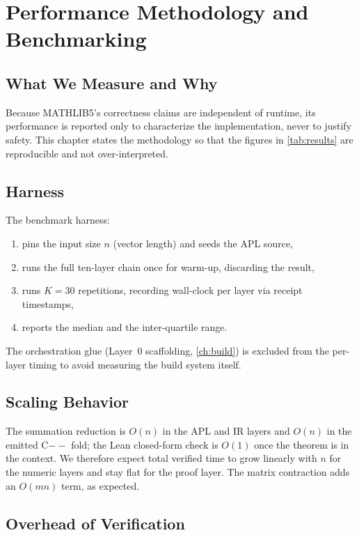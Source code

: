 \chapter{Performance Methodology and Benchmarking}
\label{ch:perf}

\section{What We Measure and Why}
\label{sec:perf-what}

Because MATHLIB5's correctness claims are independent of runtime, its
performance is reported only to characterize the implementation, never to
justify safety. This chapter states the methodology so that the figures in
\cref{tab:results} are reproducible and not over-interpreted.

\section{Harness}
\label{sec:perf-harness}

The benchmark harness:
\begin{enumerate}
  \item pins the input size $n$ (vector length) and seeds the APL source,
  \item runs the full ten-layer chain once for warm-up, discarding the
        result,
  \item runs $K=30$ repetitions, recording wall-clock per layer via
        receipt timestamps,
  \item reports the median and the inter-quartile range.
\end{enumerate}
The orchestration glue (Layer~0 scaffolding, \cref{ch:build}) is excluded
from the per-layer timing to avoid measuring the build system itself.

\section{Scaling Behavior}
\label{sec:perf-scaling}

The summation reduction is $O(n)$ in the APL and IR layers and $O(n)$ in
the emitted C$--$ fold; the Lean closed-form check is $O(1)$ once the
theorem is in the context. We therefore expect total verified time to grow
linearly with $n$ for the numeric layers and stay flat for the proof layer.
The matrix contraction adds an $O(mn)$ term, as expected.

\section{Overhead of Verification}
\label{sec:perf-overhead}

